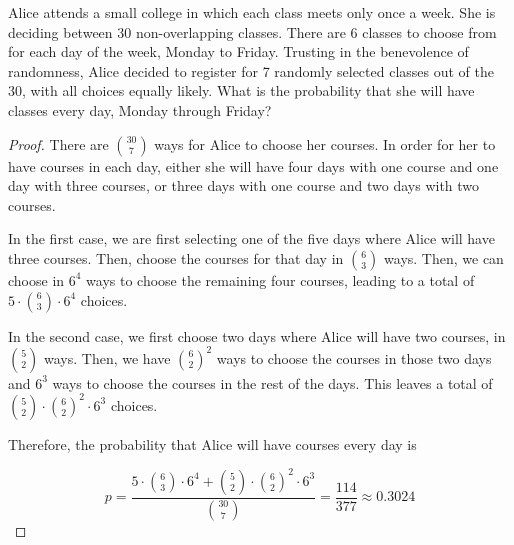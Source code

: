 \begin{exercise}{54}
    Alice attends a small college in which each class meets only once a week. She is deciding between 30 non-overlapping classes. There are 6 classes to choose from for each day of the week, Monday to Friday. Trusting in the benevolence of randomness, Alice decided to register for 7 randomly selected classes out of the 30, with all choices equally likely. What is the probability that she will have classes every day, Monday through Friday?
\end{exercise}

\begin{proof}
    There are ${30 \choose 7}$ ways for Alice to choose her courses. In order for her to have courses in each day, either she will have four days with one course and one day with three courses, or three days with one course and two days with two courses.

    In the first case, we are first selecting one of the five days where Alice will have three courses. Then, choose the courses for that day in $6 \choose 3$ ways. Then, we can choose in $6^4$ ways to choose the remaining four courses, leading to a total of $5 \cdot {6 \choose 3} \cdot 6^4$ choices.

    In the second case, we first choose two days where Alice will have two courses, in ${5 \choose 2}$ ways. Then, we have ${6 \choose 2}^2$ ways to choose the courses in those two days and $6^3$ ways to choose the courses in the rest of the days. This leaves a total of ${5 \choose 2} \cdot {6 \choose 2}^2 \cdot 6^3$ choices.

    Therefore, the probability that Alice will have courses every day is

    $$p = \frac{5 \cdot {6 \choose 3} \cdot 6^4 + {5 \choose 2} \cdot {6 \choose 2}^2 \cdot 6^3}{{30 \choose 7}} = \frac{114}{377} \approx 0.3024 $$
\end{proof}

